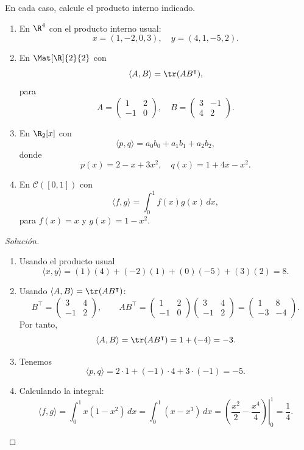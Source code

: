 \documentclass[a4,11pt]{aleph-notas}
\begin{document}
\begin{ejer}
    En cada caso, calcule el producto interno indicado.
    \begin{enumerate}
        \item En $\R^4$ con el producto interno usual:
        \[
            x=(1,-2,0,3),\quad y=(4,1,-5,2).
        \]
        \item En $\Mat[\R]{2}{2}$ con
        \[
            \langle A,B\rangle = \tr(AB^\intercal),
        \]
        para
        \[
            A=\begin{pmatrix}1&2\\-1&0\end{pmatrix},\quad
            B=\begin{pmatrix}3&-1\\4&2\end{pmatrix}.
        \]
        \item En $\R_2[x]$ con
        \[
            \langle p,q\rangle = a_0b_0+a_1b_1+a_2b_2,
        \]
        donde
        \[
            p(x)=2-x+3x^2,\quad q(x)=1+4x-x^2.
        \]
        \item En $\mathcal{C}([0,1])$ con
        \[
            \langle f,g\rangle = \int_0^1 f(x)g(x)\,dx,
        \]
        para $f(x)=x$ y $g(x)=1-x^2$.
    \end{enumerate}
\end{ejer}

\begin{proof}[Solución]\hspace{0pt}
    \begin{enumerate}
        \item Usando el producto usual
        \[
            \langle x,y\rangle = (1)(4)+(-2)(1)+(0)(-5)+(3)(2)=8.
        \]
        \item Usando $\langle A,B\rangle=\tr(AB^\intercal)$:
        \[
            B^\intercal=\begin{pmatrix}3&4\\-1&2\end{pmatrix},
            \qquad
            AB^\intercal=
            \begin{pmatrix}1&2\\-1&0\end{pmatrix}
            \begin{pmatrix}3&4\\-1&2\end{pmatrix}
            =\begin{pmatrix}1&8\\-3&-4\end{pmatrix}.
        \]
        Por tanto,
        \[
            \langle A,B\rangle=\tr(AB^\intercal)=1+(-4)=-3.
        \]
        \item Tenemos
        \[
            \langle p,q\rangle = 2\cdot 1 + (-1)\cdot 4 + 3\cdot(-1) = -5.
        \]
        \item Calculando la integral:
        \[
            \langle f,g\rangle=\int_0^1 x(1-x^2)\,dx
            =\int_0^1(x-x^3)\,dx
            =\left.\left(\frac{x^2}{2}-\frac{x^4}{4}\right)\right|_0^1
            =\frac14.
        \]
    \end{enumerate}
\end{proof}
\end{document}
